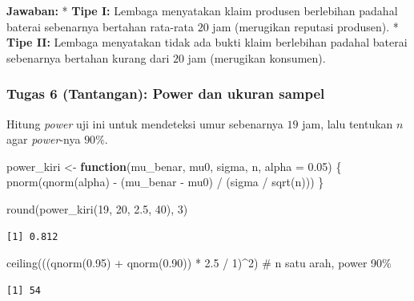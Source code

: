 \documentclass[
  indonesian,
  letterpaper,
]{book}
\newenvironment{Shaded}{\begin{snugshade}}{\end{snugshade}}
\newcommand{\AttributeTok}[1]{\textcolor[rgb]{0.40,0.45,0.13}{#1}}
\newcommand{\CommentTok}[1]{\textcolor[rgb]{0.37,0.37,0.37}{#1}}
\newcommand{\ControlFlowTok}[1]{\textcolor[rgb]{0.00,0.23,0.31}{\textbf{#1}}}
\newcommand{\DecValTok}[1]{\textcolor[rgb]{0.68,0.00,0.00}{#1}}
\newcommand{\FloatTok}[1]{\textcolor[rgb]{0.68,0.00,0.00}{#1}}
\newcommand{\FunctionTok}[1]{\textcolor[rgb]{0.28,0.35,0.67}{#1}}
\newcommand{\NormalTok}[1]{\textcolor[rgb]{0.00,0.23,0.31}{#1}}
\newcommand{\OtherTok}[1]{\textcolor[rgb]{0.00,0.23,0.31}{#1}}
\newcommand{\SpecialCharTok}[1]{\textcolor[rgb]{0.37,0.37,0.37}{#1}}
\begin{document}
\textbf{Jawaban:} * \textbf{Tipe I:} Lembaga menyatakan klaim produsen
berlebihan padahal baterai sebenarnya bertahan rata-rata \(20\) jam
(merugikan reputasi produsen). * \textbf{Tipe II:} Lembaga menyatakan
tidak ada bukti klaim berlebihan padahal baterai sebenarnya bertahan
kurang dari \(20\) jam (merugikan konsumen).

\subsubsection{Tugas 6 (Tantangan): Power dan ukuran
sampel}\label{tugas-6-tantangan-power-dan-ukuran-sampel}

Hitung \emph{power} uji ini untuk mendeteksi umur sebenarnya \(19\) jam,
lalu tentukan \(n\) agar \emph{power}-nya \(90\%\).

\begin{Shaded}
\begin{Highlighting}[]
\NormalTok{power\_kiri }\OtherTok{\textless{}{-}} \ControlFlowTok{function}\NormalTok{(mu\_benar, mu0, sigma, n, }\AttributeTok{alpha =} \FloatTok{0.05}\NormalTok{) \{}
  \FunctionTok{pnorm}\NormalTok{(}\FunctionTok{qnorm}\NormalTok{(alpha) }\SpecialCharTok{{-}}\NormalTok{ (mu\_benar }\SpecialCharTok{{-}}\NormalTok{ mu0) }\SpecialCharTok{/}\NormalTok{ (sigma }\SpecialCharTok{/} \FunctionTok{sqrt}\NormalTok{(n)))}
\NormalTok{\}}

\FunctionTok{round}\NormalTok{(}\FunctionTok{power\_kiri}\NormalTok{(}\DecValTok{19}\NormalTok{, }\DecValTok{20}\NormalTok{, }\FloatTok{2.5}\NormalTok{, }\DecValTok{40}\NormalTok{), }\DecValTok{3}\NormalTok{)}
\end{Highlighting}
\end{Shaded}

\begin{verbatim}
[1] 0.812
\end{verbatim}

\begin{Shaded}
\begin{Highlighting}[]
\FunctionTok{ceiling}\NormalTok{(((}\FunctionTok{qnorm}\NormalTok{(}\FloatTok{0.95}\NormalTok{) }\SpecialCharTok{+} \FunctionTok{qnorm}\NormalTok{(}\FloatTok{0.90}\NormalTok{)) }\SpecialCharTok{*} \FloatTok{2.5} \SpecialCharTok{/} \DecValTok{1}\NormalTok{)}\SpecialCharTok{\^{}}\DecValTok{2}\NormalTok{) }\CommentTok{\# n satu arah, power 90\%}
\end{Highlighting}
\end{Shaded}

\begin{verbatim}
[1] 54
\end{verbatim}
\end{document}
